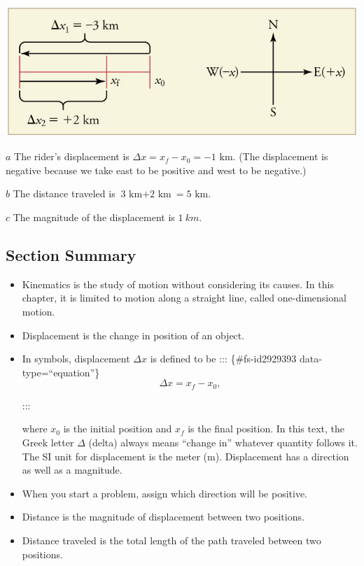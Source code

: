 \documentclass[
]{book}
\begin{document}
\leavevmode{}%
\includegraphics{images/Figure_02_01_03.jpg}

\(a\) The rider's displacement is
\({{\Delta x = {x_{f} - x_{0}}} = \text{−1\ km}}{}\). (The displacement is
negative because we take east to be positive and west to be negative.)

\(b\) The distance traveled is
\({{\text{3\ km} + \text{2\ km}} = \text{5\ km}}{}\).

\(c\) The magnitude of the displacement is \(1\ km{}\).

\hypertarget{fs-id2758854-summary}{}
\hypertarget{section-summary}{%
\subsection{Section Summary}\label{section-summary}}

\begin{itemize}
\item
  Kinematics is the study of motion without considering its causes. In
  this chapter, it is limited to motion along a straight line, called
  one-dimensional motion.
\item
  Displacement is the change in position of an object.
\item
  In symbols, displacement \({\Delta x}{}\) is defined to be
  ::: \{\#fs-id2929393 data-type=``equation''\}
  \[{\Delta x = {x_{f} - x_{0}},}{}\]

  :::

  where \(x_{0}\) is the initial position and \(x_{f}{}\) is the final
  position. In this text, the Greek letter \(\Delta{}\) (delta) always
  means ``change in'' whatever quantity follows it. The SI unit for
  displacement is the meter (m). Displacement has a direction as well
  as a magnitude.
\item
  When you start a problem, assign which direction will be positive.
\item
  Distance is the magnitude of displacement between two positions.
\item
  Distance traveled is the total length of the path traveled between
  two positions.
\end{itemize}
\end{document}

